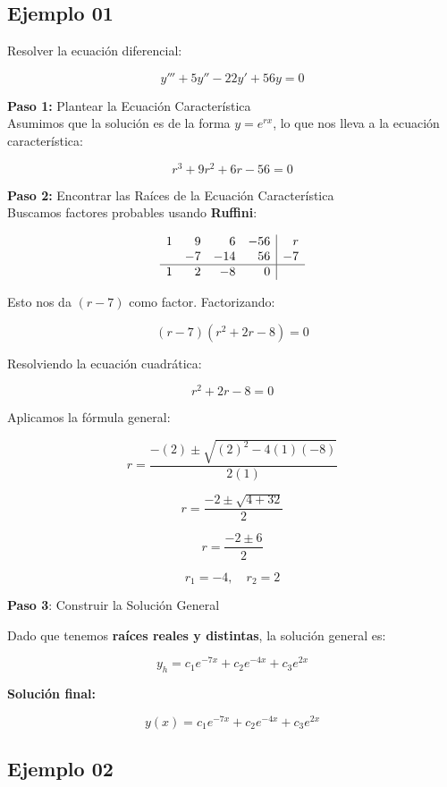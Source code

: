 \subsection{Ejemplo 01}
Resolver la ecuación diferencial:

\[
y'''+5y''-22y'+56y=0
\]

\textbf{Paso 1:} Plantear la Ecuación Característica\\

Asumimos que la solución es de la forma \( y = e^{r x} \), lo que nos lleva a la ecuación característica:

\[
r^{3}+9r^{2} +6r-56 = 0
\]

\textbf{Paso 2:}  Encontrar las Raíces de la Ecuación Característica \\

Buscamos factores probables usando \textbf{Ruffini}:

\[
\begin{array}{rrrr| r}
  1 & 9 & 6 & -56 & r \\
    & -7 & -14 & 56 & -7\\
  \hline
  1 & 2 & -8 & 0 &  \\
\end{array}
\]

Esto nos da \( (r -7) \) como factor. Factorizando:

\[
(r-7)(r^2 + 2r - 8) = 0
\]

Resolviendo la ecuación cuadrática:

\[
r^2 + 2r - 8 = 0
\]

Aplicamos la fórmula general:

\[
r = \frac{-(2) \pm \sqrt{(2)^2 - 4(1)(-8)}}{2(1)}
\]

\[
r = \frac{-2 \pm \sqrt{4+32}}{2}
\]

\[
r = \frac{-2 \pm 6}{2}
\]

\[
r_1 = -4, \quad r_2 = 2
\]

\textbf{Paso 3}: Construir la Solución General

Dado que tenemos \textbf{raíces reales y distintas}, la solución general es:

\[
y_h = c_1 e^{-7x} + c_2 e^{-4x} + c_3 e^{2x}
\]

\textbf{Solución final:}

\[
y(x) = c_1 e^{-7x} + c_2 e^{-4x} + c_3 e^{2x}
\]


\subsection{Ejemplo 02}

